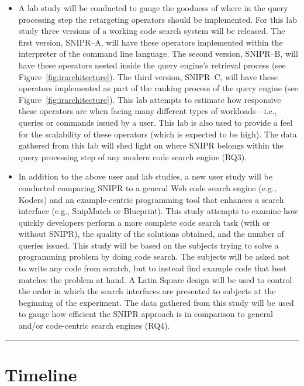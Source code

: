 \begin{itemize}
\item A lab study will be conducted to gauge the goodness of where in the query processing step the retargeting operators should be implemented. For this lab study three versions of a working code search system will be released. The first version, \uppercase{SnipR}--A, will have these operators implemented within the interpreter of the command line language. The second version, \uppercase{SnipR}--B, will have these operators nested inside the query engine's retrieval process (see Figure~\ref{fig:irarchitecture}). The third version, \uppercase{SnipR}--C, will have these operators implemented as part of the ranking process of the query engine (see Figure~\ref{fig:irarchitecture}). This lab attempts to estimate how responsive these operators are when facing many different types of workloads---i.e., queries or commands issued by a user. This lab is also used to provide a feel for the scalability of these operators (which is expected to be high). The data gathered from this lab will shed light on where \uppercase{SnipR} belongs within the query processing step of any modern code search engine (RQ3). 

\item In addition to the above user and lab studies, a new user study will be conducted comparing \uppercase{SnipR} to a general Web code search engine (e.g., Koders) and an example-centric programming tool that enhances a search interface (e.g., SnipMatch or Blueprint). This study attempts to examine how quickly developers perform a more complete code search task (with or without \uppercase{SnipR}), the quality of the solutions obtained, and the number of queries issued. This study will be based on the subjects trying to solve a programming problem by doing code search. The subjects will be asked not to write any code from scratch, but to instead find example code that best matches the problem at hand. A Latin Square design will be used to control the order in which the search interfaces are presented to subjects at the beginning of the experiment. The data gathered from this study will be used to gauge how efficient the \uppercase{SnipR} approach is in comparison to general and/or code-centric search engines (RQ4).     
\end{itemize}

\fancybreak{\pfbreakdisplay}

\section{Timeline}
\label{sec:workplan}

